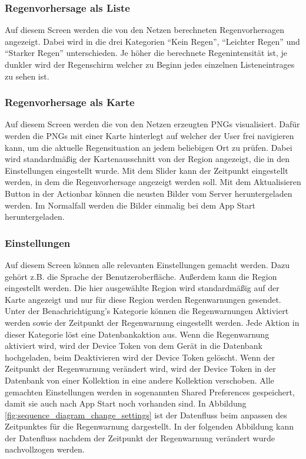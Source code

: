 \subsubsection*{Regenvorhersage als Liste}
Auf diesem Screen werden die von den Netzen berechneten Regenvorhersagen angezeigt. 
Dabei wird in die drei Kategorien “Kein Regen”, “Leichter Regen” und “Starker Regen” unterschieden. 
Je höher die berechnete Regenintensität ist, je dunkler wird der Regenschirm welcher zu Beginn jedes einzelnen Listeneintrages zu sehen ist.   

\subsubsection*{Regenvorhersage als Karte}
Auf diesem Screen werden die von den Netzen erzeugten PNGs visualisiert. 
Dafür werden die PNGs mit einer Karte hinterlegt auf welcher der User frei navigieren kann, 
um die aktuelle Regensituation an jedem beliebigen Ort zu prüfen. 
Dabei wird standardmäßig der Kartenausschnitt von der Region angezeigt, die in den Einstellungen eingestellt wurde. 
Mit dem Slider kann der Zeitpunkt eingestellt werden, in dem die Regenvorhersage angezeigt werden soll. 
Mit dem Aktualisieren Button in der Actionbar können die neusten Bilder vom Server heruntergeladen werden. 
Im Normalfall werden die Bilder einmalig bei dem App Start heruntergeladen.  

\subsubsection*{Einstellungen}
Auf diesem Screen können alle relevanten Einstellungen gemacht werden. Dazu gehört z.B. die Sprache der Benutzeroberfläche. 
Außerdem kann die Region eingestellt werden. 
Die hier ausgewählte Region wird standardmäßig auf der Karte angezeigt und nur für diese Region werden Regenwarnungen gesendet. 
Unter der Benachrichtigung’s Kategorie können die Regenwarnungen Aktiviert werden sowie der Zeitpunkt der Regenwarnung eingestellt werden. 
Jede Aktion in dieser Kategorie löst eine Datenbankaktion aus. 
Wenn die Regenwarnung aktiviert wird, wird der Device Token von dem Gerät in die Datenbank hochgeladen, beim Deaktivieren wird der Device Token gelöscht. 
Wenn der Zeitpunkt der Regenwarnung verändert wird, wird der Device Token in der Datenbank von einer Kollektion in eine andere Kollektion verschoben.   
Alle gemachten Einstellungen werden in sogenannten Shared Preferences gespeichert, damit sie auch nach App Start noch vorhanden sind.   
In Abbildung \ref*{fig:sequence_diagram_change_settings} ist der Datenfluss beim anpassen des Zeitpunktes für die Regenwarnung 
dargestellt. 
In der folgenden Abbildung kann der Datenfluss nachdem der Zeitpunkt der Regenwarnung verändert wurde nachvollzogen werden.

